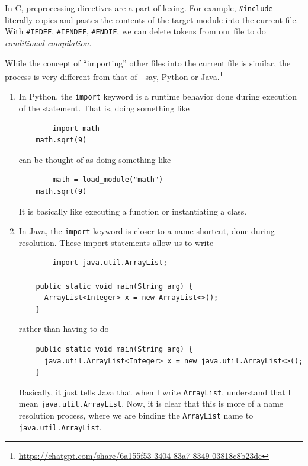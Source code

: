   In C, preprocessing directives are a part of lexing. For example, \texttt{\#include} literally copies and pastes the contents of the target module into the current file. With \texttt{\#IFDEF}, \texttt{\#IFNDEF}, \texttt{\#ENDIF}, we can delete tokens from our file to do \textit{conditional compilation}. 

  While the concept of ``importing'' other files into the current file is similar, the process is very different from that of---say, Python or Java.\footnote{\href{https://chatgpt.com/share/6a155f53-3404-83a7-8349-03818c8b23de}{https://chatgpt.com/share/6a155f53-3404-83a7-8349-03818c8b23de}}

  \begin{enumerate}
    \item In Python, the \texttt{import} keyword is a runtime behavior done during execution of the statement. That is, doing something like 
      \begin{lstlisting}
        import math 
	math.sqrt(9) 
      \end{lstlisting}

      can be thought of as doing something like 

      \begin{lstlisting}
        math = load_module("math") 
	math.sqrt(9)
      \end{lstlisting}

      It is basically like executing a function or instantiating a class.

    \item In Java, the \texttt{import} keyword is closer to a name shortcut, done during resolution. These import statements allow us to write 
      \begin{lstlisting}
        import java.util.ArrayList; 

	public static void main(String arg) {
	  ArrayList<Integer> x = new ArrayList<>();
	}
      \end{lstlisting}
      
      rather than having to do 

      \begin{lstlisting}
	public static void main(String arg) {
	  java.util.ArrayList<Integer> x = new java.util.ArrayList<>();
	}
      \end{lstlisting}

      Basically, it just tells Java that when I write \texttt{ArrayList}, understand that I mean \texttt{java.util.ArrayList}. Now, it is clear that this is more of a name resolution process, where we are binding the \texttt{ArrayList} name to \texttt{java.util.ArrayList}. 
  \end{enumerate}
  
